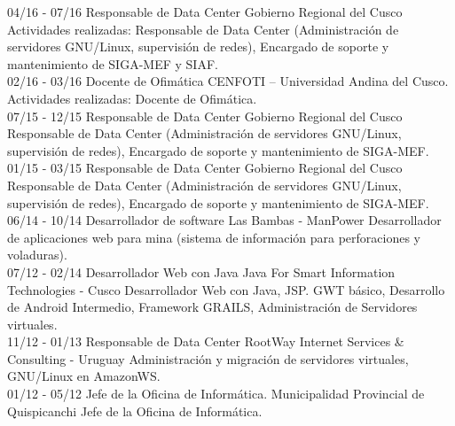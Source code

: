 \documentclass[]{friggeri-cv}
\begin{document}
\begin{entrylist}
    \entry
    {04/16 - 07/16}
    {Responsable de Data Center}
    {Gobierno Regional del Cusco}
    {Actividades realizadas: Responsable de Data Center (Administraci\'on de servidores GNU/Linux, supervisi\'on
    de redes), Encargado de soporte y mantenimiento de SIGA-MEF y SIAF.\\}
    \entry
    {02/16 - 03/16}
    {Docente de Ofim\'atica}
    {CENFOTI – Universidad Andina del Cusco.}
    {Actividades realizadas: Docente de Ofim\'atica.\\}
    \entry
    {07/15 - 12/15}
    {Responsable de Data Center}
    {Gobierno Regional del Cusco}
    {Responsable de Data Center (Administraci\'on de servidores GNU/Linux, supervisi\'on de redes), Encargado de
    soporte y mantenimiento de SIGA-MEF.\\}
    \entry
    {01/15 - 03/15}
    {Responsable de Data Center}
    {Gobierno Regional del Cusco}
    {Responsable de Data Center (Administraci\'on de servidores GNU/Linux, supervisi\'on de redes), Encargado de
    soporte y mantenimiento de SIGA-MEF.\\}
    \entry
    {06/14 - 10/14}
    {Desarrollador de software}
    {Las Bambas - ManPower}
    {Desarrollador de aplicaciones web para mina (sistema de informaci\'on para perforaciones y voladuras).\\}
    \entry
    {07/12 - 02/14}
    {Desarrollador Web con Java}
    {Java For Smart Information Technologies - Cusco}
    {Desarrollador Web con Java, JSP. GWT b\'asico, Desarrollo de Android Intermedio, Framework GRAILS, Administraci\'on de Servidores virtuales.\\}
    \entry
    {11/12 - 01/13}
    {Responsable de Data Center}
    {{RootWay Internet Services \& Consulting - Uruguay}}
    {{Administraci\'on y migraci\'on de servidores virtuales, GNU/Linux en AmazonWS. \\ }}
    \entry
    {01/12 - 05/12}
    {Jefe de la Oficina de Inform\'atica.}
    {Municipalidad Provincial de Quispicanchi}
    {Jefe de la Oficina de Inform\'atica.\\}
\end{entrylist}
\end{document}
